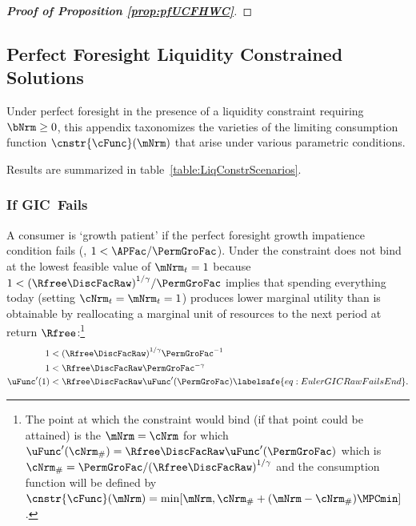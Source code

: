 \documentclass[\econtexRoot/BufferStockTheory]{subfiles}
\begin{document}
\begin{proof}[\textbf{Proof of Proposition \ref{prop:pfUCFHWC}}]
\end{proof}

\subsection{Perfect Foresight Liquidity Constrained Solutions}

Under perfect foresight in the presence of a liquidity constraint requiring $\bNrm \geq 0$, this appendix taxonomizes the varieties of the limiting consumption function $\cnstr{\cFunc}(\mNrm)$ that arise under various parametric conditions.



Results are summarized in table~\ref{table:LiqConstrScenarios}.

\subsubsection{If {GIC}~Fails}

A consumer is `growth patient' if the perfect foresight growth
impatience condition fails (\cncl{\GICRaw}, $1 < \APFac/\PermGroFac$).
Under
\cncl{\GICRaw} the constraint does not bind at the lowest feasible value of $\mNrm_{t}=1$ because
$1 < {(\Rfree\DiscFacRaw)}^{1/\CRRA}/\PermGroFac$ implies that spending
everything today (setting $\cNrm_{t}=\mNrm_{t}=1$) produces lower
marginal utility than is obtainable by reallocating a marginal unit of
resources to the next period at return $\Rfree$:\footnote{The point at
  which the constraint would bind (if that point could be attained) is
  the $\mNrm=\cNrm$ for which $\uFunc^{\prime}(\cNrm_{\#}) = \Rfree
  \DiscFacRaw \uFunc^{\prime}(\PermGroFac)$ which is $\cNrm_{\#} =
  \PermGroFac/{(\Rfree \DiscFacRaw)}^{1/\CRRA}$ and the consumption function
  will be defined by
  $\cnstr{\cFunc}(\mNrm)=\min[\mNrm,\cNrm_{\#}+(\mNrm-\cNrm_{\#})\MPCmin
  ]$.}
\begin{equation}\begin{gathered}\begin{aligned}
  1  & < {(\Rfree \DiscFacRaw)}^{1/\CRRA}\PermGroFac^{-1}    \notag
  \\ 1  & < \Rfree \DiscFacRaw \PermGroFac^{-\CRRA} \notag
  \\  \uFunc^{\prime}(1)  & < \Rfree \DiscFacRaw \uFunc^{\prime}(\PermGroFac)   \labelsafe{eq:EulerGICRawFailsEnd}.
\end{aligned}\end{gathered}\end{equation}
\end{document}
